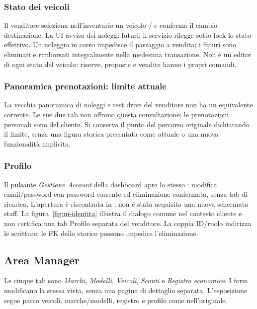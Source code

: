 \subsubsection{Stato dei veicoli}
Il venditore seleziona nell'inventario un veicolo /
e conferma il cambio destinazione. La UI avvisa dei noleggi futuri;
il servizio rilegge sotto lock lo stato effettivo. Un noleggio in corso
impedisce il passaggio a vendita; i futuri sono eliminati e rimborsati
integralmente nella medesima transazione. Non è un editor di ogni stato
del veicolo: riserve, proposte e vendite hanno i propri comandi.

\subsubsection{Panoramica prenotazioni: limite attuale}
La vecchia panoramica di noleggi e test drive del venditore non ha un
equivalente corrente. Le sue due tab non offrono questa consultazione;
le prenotazioni personali sono del cliente. Si conserva il punto del
percorso originale dichiarando il limite, senza una figura storica
presentata come attuale o una nuova funzionalità implicita.

\subsubsection{Profilo}
Il pulsante \emph{Gestione Account} della dashboard apre lo stesso
: modifica email/password con password
corrente ed eliminazione confermata, senza tab di ricarica. L'apertura
è riscontrata in ; non è stata
acquisita una nuova schermata staff. La figura~\ref{fig:ui-identita}
illustra il dialogo comune nel contesto cliente e non certifica una tab
Profilo separata del venditore. La coppia ID/ruolo indirizza le scritture;
le FK dello storico possono impedire l'eliminazione.
\clearpage

\subsection{Area Manager}
Le cinque tab sono \emph{Marchi}, \emph{Modelli}, \emph{Veicoli},
\emph{Sconti} e \emph{Registro economico}. I form modificano la stessa
vista, senza una pagina di dettaglio separata. L'esposizione segue
parco veicoli, marche/modelli, registro e profilo come nell'originale.

